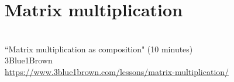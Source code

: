 \section{Matrix multiplication}
\begin{bookfigure}
   \\
  ``Matrix multiplication as composition" (10 minutes) \\
  \footnotesize 3Blue1Brown \\
  \url{https://www.3blue1brown.com/lessons/matrix-multiplication/}
\end{bookfigure}
